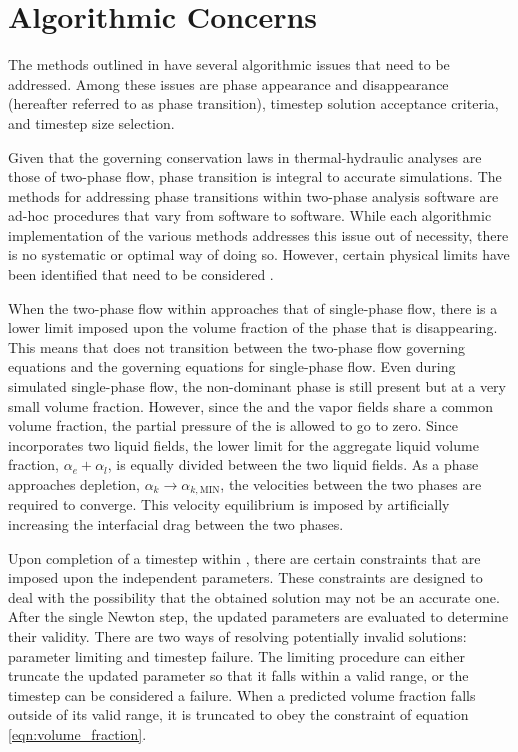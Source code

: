 \section{Algorithmic Concerns}
\label{sect:algorithmic_concerns}

The methods outlined in  have several algorithmic issues that need to be addressed.
Among these issues are phase appearance and disappearance (hereafter referred to as phase transition), timestep solution acceptance criteria, and timestep size selection.

Given that the governing conservation laws in thermal-hydraulic analyses are those of two-phase flow, phase transition is integral to accurate simulations.
The methods for addressing phase transitions within two-phase analysis software are ad-hoc procedures that vary from software to software.
While each algorithmic implementation of the various methods addresses this issue out of necessity, there is no systematic or optimal way of doing so.
However, certain physical limits have been identified that need to be considered \cite{Bestion2000}.

When the two-phase flow within \cobra{} approaches that of single-phase flow, there is a lower limit imposed upon the volume fraction of the phase that is disappearing.
This means that \cobra{} does not transition between the two-phase flow governing equations and the governing equations for single-phase flow.
Even during simulated single-phase flow, the non-dominant phase is still present but at a very small volume fraction.
However, since the \ncgs{} and the vapor fields share a common volume fraction, the partial pressure of the \ncgs{} is allowed to go to zero. 
Since \cobra{} incorporates two liquid fields, the lower limit for the aggregate liquid volume fraction, $\alpha_e + \alpha_l$, is equally divided between the two liquid fields.
As a phase approaches depletion, $\alpha_k \rightarrow \alpha_{k,\text{MIN}}$, the velocities between the two phases are required to converge.
This velocity equilibrium is imposed by artificially increasing the interfacial drag between the two phases.

Upon completion of a timestep within \cobra{}, there are certain constraints that are imposed upon the independent parameters.
These constraints are designed to deal with the possibility that the obtained solution may not be an accurate one.
After the single Newton step, the updated parameters are evaluated to determine their validity.
There are two ways of resolving potentially invalid solutions: parameter limiting and timestep failure.
The limiting procedure can either truncate the updated parameter so that it falls within a valid range, or the timestep can be considered a failure.
When a predicted volume fraction falls outside of its valid range, it is truncated to obey the constraint of equation \eqref{eqn:volume_fraction}.

